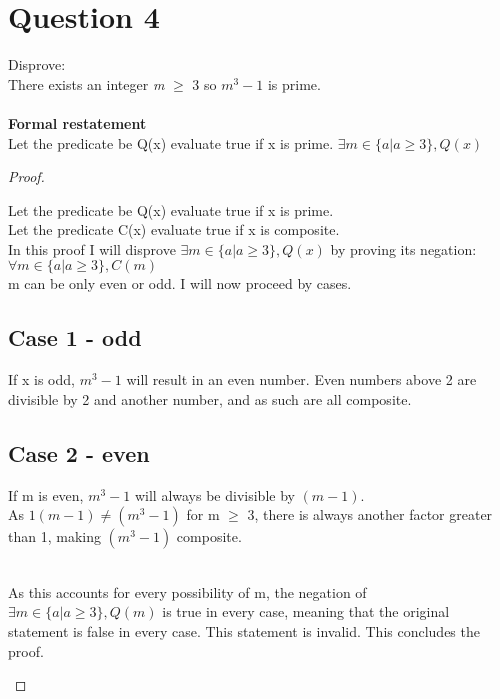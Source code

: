 \documentclass{article}
\begin{document}
\section*{Question 4}
Disprove:\\
There exists an integer \textit{m} $\ge$ 3 so $m^3-1$ is prime.\\\\
\textbf{Formal restatement}\\
Let the predicate be Q(x) evaluate true if x is prime.
$\exists m \in \{a | a \ge 3\}, Q(x)$
\begin{proof}
  \begin{addmargin}{1em}
    Let the predicate be Q(x) evaluate true if x is prime.\\
    Let the predicate C(x) evaluate true if x is composite.\\
    In this proof I will disprove $\exists m \in \{a | a \ge 3\}, Q(x)$ by proving its negation:\\
    $\forall m \in \{a | a \ge 3\}, C(m)$\\
    m can be only even or odd. I will now proceed by cases. \\
    \subsection*{Case 1 - odd}
    \begin{addmargin}{1em}
      If x is odd, $m^3-1$ will result in an even number. Even numbers above 2 are divisible by 2 and another number, and as such are all composite.\\
    \end{addmargin}
    \subsection*{Case 2 - even}
    \begin{addmargin}{1em}
      If m is even, $m^3-1$ will always be divisible by $(m-1)$. \\
      As $1(m-1) \neq (m^3-1)$ for m $\ge$ 3, there is always another factor greater than 1, making $(m^3-1)$ composite.\\\\
    \end{addmargin}
    As this accounts for every possibility of m, the negation of $\exists m \in \{a | a \ge 3\}, Q(m)$ is true in every case, meaning that the original statement is false in every case. This statement is invalid. This concludes the proof.
  \end{addmargin}
\end{proof}
\end{document}
